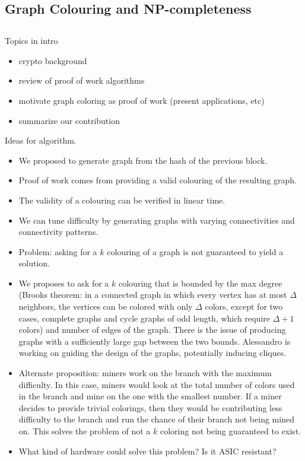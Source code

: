 \subsection{Graph Colouring and NP-completeness}

\subsection{\graff}

Topics in intro
\begin{itemize}
	\item crypto background
	\item review of proof of work algorithms
	\item motivate graph coloring as proof of work (present applications, etc)
	\item summarize our contribution
\end{itemize}


Ideas for algorithm.
\begin{itemize}
	\item We proposed to generate graph from the hash of the previous block.
	\item Proof of work comes from providing a valid colouring of the resulting graph.
	\item The validity of a colouring can be verified in linear time.
	\item We can tune difficulty by generating graphs with varying connectivities and connectivity patterns.
	\item Problem: asking for a $k$ colouring of a graph is not guaranteed to yield a solution.
	\item We proposes to ask for a $k$ colouring that is bounded by the max degree (Brooks theorem: in a connected graph in which every vertex has at most $\Delta$ neighbors, the vertices can be colored with only $\Delta$ colors, except for two cases, complete graphs and cycle graphs of odd length, which require $\Delta + 1$ colors) and number of edges of the graph. There is the issue of producing graphs with a sufficiently large gap between the two bounds. Alessandro is working on guiding the design of the graphs, potentially inducing cliques.
	\item Alternate proposition: miners work on the branch with the maximum difficulty. In this case, miners would look at the total number of colors used in the branch and mine on the one with the smallest number. If a miner decides to provide trivial colorings, then they would be contributing less difficulty to the branch and run the chance of their branch not being mined on. This solves the problem of not a $k$ coloring not being guaranteed to exist.
	\item What kind of hardware could solve this problem? Is it ASIC resistant?
\end{itemize}